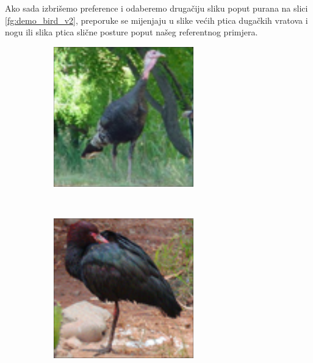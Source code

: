 \documentclass[times, utf8, proizvoljni, numeric]{fer}
\newcommand{\rulesep}{\unskip\ \vrule\ }
\begin{document}
Ako sada izbrišemo preference i odaberemo drugačiju sliku poput purana na slici \ref{fg:demo_bird_v2}, preporuke se mijenjaju u slike većih ptica dugačkih vratova i nogu ili slika ptica slične posture poput našeg referentnog primjera. 

\begin{figure}[ht!]
	\begin{subfigure}[t]{0.24\textwidth}
		\includegraphics[width=\textwidth,height=\textwidth ]{./imgs/demo-preporucitelja-po-sadrzaju/tijek-rada/id@2.png}
	\end{subfigure}
	\rulesep
	\begin{subfigure}[t]{0.24\textwidth}
		\includegraphics[width=\textwidth,height=\textwidth]{./imgs/demo-preporucitelja-po-sadrzaju/tijek-rada/id@148.png}

\end{subfigure}
\end{figure}
\end{document}
